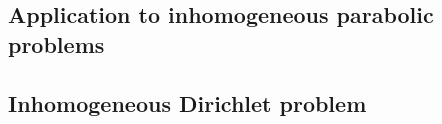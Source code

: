\documentclass[english,a4paper,9pt,oneside]{scrbook}	%
\theoremstyle{break}
\theoremstyle{remark}
\newcommand{\ds}{\displaystyle}
\newcommand{\norm}[1]{\left\lVert#1\right\rVert}
\newcommand{\HN}[1]{\norm{#1}_{H}}
\newcommand{\VN}[1]{\norm{#1}_{V}}
\newcommand{\VSN}[1]{\norm{#1}_{V^*}}
\newcommand{\emb}{\hookrightarrow}
\begin{document}
\begin{appendices}
%
%
%
%
%
%
%
%
%
%
%
%
%

\section{Application to inhomogeneous parabolic problems}

\subsection{Inhomogeneous Dirichlet problem}
\label{subs:inh_diri}


\end{appendices}
\end{document}
